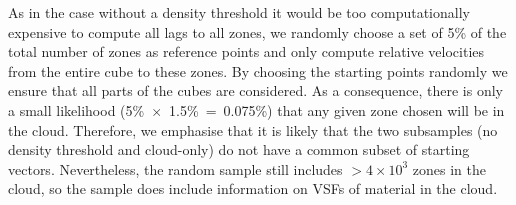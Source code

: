 As in the case without a density threshold it would be too computationally expensive to compute all lags to all zones, we randomly choose a set of 5\% of the total number of zones as reference points and only compute relative velocities from the entire cube to these zones.
By choosing the starting points randomly we ensure that all parts of the cubes are considered. 
As a consequence, there is only a small likelihood (5\%~$\times$~1.5\%~=~0.075\%) that any given zone chosen will be in the cloud.
Therefore, we emphasise that it is likely that the two subsamples (no density threshold and cloud-only) do not have a common subset of starting vectors.
Nevertheless, the random sample still includes $>4 \times 10^3$ zones in the cloud, so the sample does include information on VSFs of material in the cloud.

\endinput
